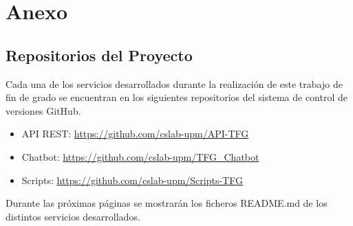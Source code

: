 \chapter*{Anexo}

\section{Repositorios del Proyecto}

Cada una de los servicios desarrollados durante la realización de este trabajo de fin de grado se encuentran en los siguientes repositorios del sistema de control de versiones GitHub.

\begin{itemize}
    \item API REST: \url{https://github.com/cslab-upm/API-TFG}
    \item Chatbot: \url{https://github.com/cslab-upm/TFG_Chatbot}
    \item Scripts: \url{https://github.com/cslab-upm/Scripts-TFG}
\end{itemize}

Durante las próximas páginas se mostrarán los ficheros README.md de los distintos servicios desarrollados.






